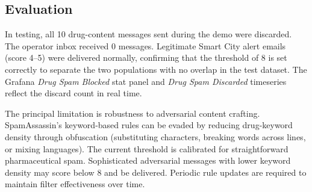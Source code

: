 \subsection{Evaluation}

In testing, all 10 drug-content messages sent during the demo were discarded.
The operator inbox received 0 messages. Legitimate Smart City alert emails
(score 4–5) were delivered normally, confirming that the threshold of 8 is set
correctly to separate the two populations with no overlap in the test dataset.
The Grafana \emph{Drug Spam Blocked} stat panel and \emph{Drug Spam Discarded}
timeseries reflect the discard count in real time.

The principal limitation is robustness to adversarial content crafting.
SpamAssassin's keyword-based rules can be evaded by reducing drug-keyword density
through obfuscation (substituting characters, breaking words across lines, or
mixing languages). The current threshold is calibrated for straightforward
pharmaceutical spam. Sophisticated adversarial messages with lower keyword
density may score below 8 and be delivered. Periodic rule updates are required
to maintain filter effectiveness over time.
